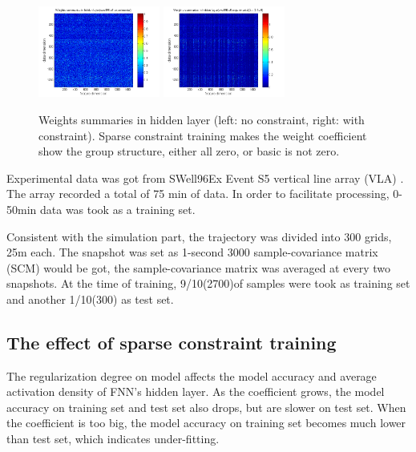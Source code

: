 \begin{figure}
\includegraphics[width=4cm,height=3cm]{figure/Weights_summaries_in_hidden_laye_swell_exp}
\includegraphics[width=4cm,height=3cm]{figure/Weights_summaries_in_hidden_layer_swell_exp_lambda_2_dot_1e_neg_5}
\caption{Weights summaries in hidden layer (left: no constraint, right: with constraint). Sparse constraint
training makes the weight coefficient show the group structure, either all zero, or basic is not zero.}
\end{figure}

Experimental data was got from SWell96Ex Event S5 vertical line array (VLA) . The array recorded a total of 75 min of data. In order to facilitate processing, 0\--50min data was took as a training set.

Consistent with the simulation part, the trajectory was divided into 300 grids, 25m each. The snapshot was set as 1-second 3000 sample-covariance matrix (SCM) would be got, the sample-covariance matrix was averaged at every two snapshots.
At the time of training, 9/10(2700)of samples were took as training set and another 1/10(300) as test set.

\subsection{The effect of sparse constraint training}
The regularization degree on model affects the model accuracy and average activation density of FNN's hidden layer. As the coefficient grows, the model accuracy on training set and test set also drops, but are slower on test set. When the coefficient is too big, the model accuracy on training set becomes much lower than test set, which indicates under-fitting.

